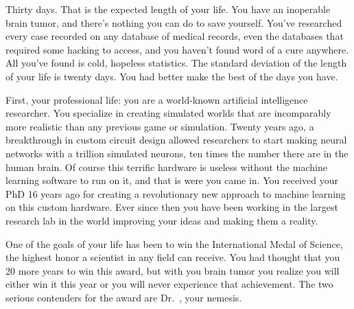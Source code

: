 \documentclass[char]{guildcamp1}
\begin{document}
\name{\cScientist{}}

Thirty days.  That is the expected length of your life.  You have an inoperable brain tumor, and there's nothing you can do to save yourself.  You've researched every case recorded on any database of medical records, even the databases that required some hacking to access, and you haven't found word of a cure anywhere.  All you've found is cold, hopeless statistics.  The standard deviation of the length of your life is twenty days.  You had better make the best of the days you have.

First, your professional life: you are a world-known artificial intelligence researcher. You specialize in creating simulated worlds that are incomparably more realistic than any previous game or simulation.  Twenty years ago, a breakthrough in custom circuit design allowed researchers to start making neural networks with a trillion simulated neurons, ten times the number there are in the human brain.  Of course this terrific hardware is useless without the machine learning software to run on it, and that is were you came in.  You received your PhD  16 years ago for creating a revolutionary new approach to machine learning on this custom hardware.  Ever since then you have been working in the largest research lab in the world improving your ideas and making them a reality.

One of the goals of your life has been to win the International Medal of Science, the highest honor a scientist in any field can receive.  You had thought that you 20 more years to win this award, but with you brain tumor you realize you will either win it this year or you will never experience that achievement.  The two serious contenders for the award are Dr.~\cRival{\intro{}}, your nemesis.  
\end{document}
